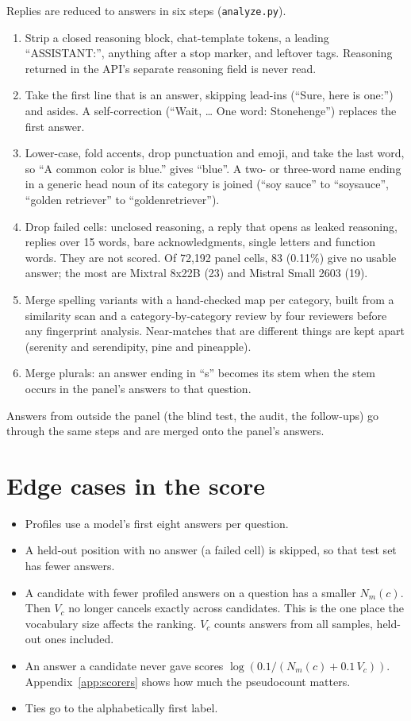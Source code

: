 \documentclass[11pt]{article}
\begin{document}
Replies are reduced to answers in six steps (\texttt{analyze.py}).
\begin{enumerate}\setlength{\itemsep}{0pt}
\item Strip a closed reasoning block, chat-template tokens, a leading ``ASSISTANT:'', anything
after a stop marker, and leftover tags. Reasoning returned in the API's separate reasoning field is
never read.
\item Take the first line that is an answer, skipping lead-ins (``Sure, here is one:'') and
asides. A self-correction (``Wait, \ldots{} One word: Stonehenge'') replaces the first answer.
\item Lower-case, fold accents, drop punctuation and emoji, and take the last word, so ``A common
color is blue.'' gives ``blue''. A two- or three-word name ending in a generic head noun of its
category is joined (``soy sauce'' to ``soysauce'', ``golden retriever'' to ``goldenretriever'').
\item Drop failed cells: unclosed reasoning, a reply that opens as leaked reasoning, replies over
15 words, bare acknowledgments, single letters and function words. They are not scored. Of 72,192
panel cells, 83 (0.11\%) give no usable answer; the most are Mixtral 8x22B (23) and Mistral Small
2603 (19).
\item Merge spelling variants with a hand-checked map per category, built from a similarity scan
and a category-by-category review by four reviewers before any fingerprint analysis. Near-matches
that are different things are kept apart (serenity and serendipity, pine and pineapple).
\item Merge plurals: an answer ending in ``s'' becomes its stem when the stem occurs in the panel's
answers to that question.
\end{enumerate}
Answers from outside the panel (the blind test, the audit, the follow-ups) go through the same
steps and are merged onto the panel's answers.

\section{Edge cases in the score}
\label{app:edges}

\begin{itemize}\setlength{\itemsep}{0pt}
\item Profiles use a model's first eight answers per question.
\item A held-out position with no answer (a failed cell) is skipped, so that test set has fewer
answers.
\item A candidate with fewer profiled answers on a question has a smaller $N_m(c)$. Then $V_c$ no
longer cancels exactly across candidates. This is the one place the vocabulary size affects the
ranking. $V_c$ counts answers from all samples, held-out ones included.
\item An answer a candidate never gave scores $\log(0.1 / (N_m(c) + 0.1\,V_c))$. Appendix~\ref{app:scorers}
shows how much the pseudocount matters.
\item Ties go to the alphabetically first label.
\end{itemize}
\end{document}

